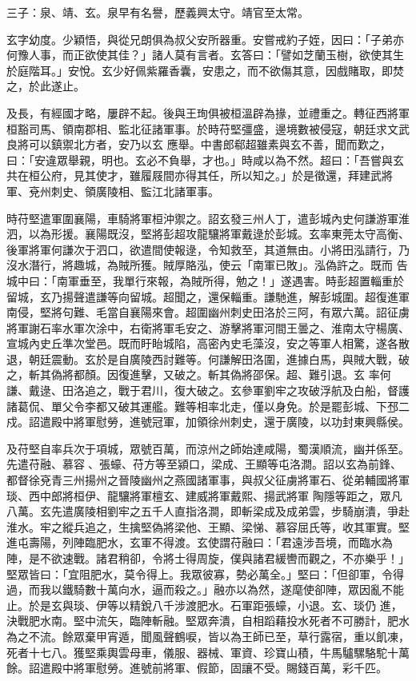 \begin{pinyinscope}
 三子：泉、靖、玄。泉早有名譽，歷義興太守。靖官至太常。



 玄字幼度。少穎悟，與從兄朗俱為叔父安所器重。安嘗戒約子姪，因曰：「子弟亦何豫人事，而正欲使其佳？」諸人莫有言者。玄答曰：「譬如芝蘭玉樹，欲使其生於庭階耳。」安悅。玄少好佩紫羅香囊，安患之，而不欲傷其意，因戲賭取，即焚之，於此遂止。



 及長，有經國才略，屢辟不起。後與王珣俱被桓溫辟為掾，並禮重之。轉征西將軍桓豁司馬、領南郡相、監北征諸軍事。於時苻堅彊盛，邊境數被侵寇，朝廷求文武良將可以鎮禦北方者，安乃以玄
 應舉。中書郎郗超雖素與玄不善，聞而歎之，曰：「安違眾舉親，明也。玄必不負舉，才也。」時咸以為不然。超曰：「吾嘗與玄共在桓公府，見其使才，雖履屐間亦得其任，所以知之。」於是徵還，拜建武將軍、兗州刺史、領廣陵相、監江北諸軍事。



 時苻堅遣軍圍襄陽，車騎將軍桓沖禦之。詔玄發三州人丁，遣彭城內史何謙游軍淮泗，以為形援。襄陽既沒，堅將彭超攻龍驤將軍戴逯於彭城。玄率東莞太守高衡、後軍將軍何謙次于泗口，欲遣間使報逯，令知救至，其道無由。小將田泓請行，乃沒水潛行，將趣城，為賊所獲。賊厚賂泓，使云「南軍已敗」。泓偽許之。既而
 告城中曰：「南軍垂至，我單行來報，為賊所得，勉之！」遂遇害。時彭超置輜重於留城，玄乃揚聲遣謙等向留城。超聞之，還保輜重。謙馳進，解彭城圍。超復進軍南侵，堅將句難、毛當自襄陽來會。超圍幽州刺史田洛於三阿，有眾六萬。詔征虜將軍謝石率水軍次涂中，右衛將軍毛安之、游擊將軍河間王曇之、淮南太守楊廣、宣城內史丘準次堂邑。既而盱眙城陷，高密內史毛藻沒，安之等軍人相驚，遂各散退，朝廷震動。玄於是自廣陵西討難等。何謙解田洛圍，進據白馬，與賊大戰，破之，斬其偽將都顏。因復進擊，又破之。斬其偽將邵保。超、難引退。玄
 率何謙、戴逯、田洛追之，戰于君川，復大破之。玄參軍劉牢之攻破浮航及白船，督護諸葛侃、單父令李都又破其運艦。難等相率北走，僅以身免。於是罷彭城、下邳二戍。詔遣殿中將軍慰勞，進號冠軍，加領徐州刺史，還于廣陵，以功封東興縣侯。



 及苻堅自率兵次于項城，眾號百萬，而涼州之師始達咸陽，蜀漢順流，幽并係至。先遣苻融、慕容、張蠔、苻方等至潁口，梁成、王顯等屯洛澗。詔以玄為前鋒、都督徐兗青三州揚州之晉陵幽州之燕國諸軍事，與叔父征虜將軍石、從弟輔國將軍琰、西中郎將桓伊、龍驤將軍檀玄、建威將軍戴熙、揚武將軍
 陶隱等距之，眾凡八萬。玄先遣廣陵相劉牢之五千人直指洛澗，即斬梁成及成弟雲，步騎崩潰，爭赴淮水。牢之縱兵追之，生擒堅偽將梁他、王顯、梁悌、慕容屈氏等，收其軍實。堅進屯壽陽，列陣臨肥水，玄軍不得渡。玄使謂苻融曰：「君遠涉吾境，而臨水為陣，是不欲速戰。諸君稍卻，令將士得周旋，僕與諸君緩轡而觀之，不亦樂乎！」堅眾皆曰：「宜阻肥水，莫令得上。我眾彼寡，勢必萬全。」堅曰：「但卻軍，令得過，而我以鐵騎數十萬向水，逼而殺之。」融亦以為然，遂麾使卻陣，眾因亂不能止。於是玄與琰、伊等以精銳八千涉渡肥水。石軍距張蠔，小退。玄、琰仍
 進，決戰肥水南。堅中流矢，臨陣斬融。堅眾奔潰，自相蹈藉投水死者不可勝計，肥水為之不流。餘眾棄甲宵遁，聞風聲鶴唳，皆以為王師已至，草行露宿，重以飢凍，死者十七八。獲堅乘輿雲母車，儀服、器械、軍資、珍寶山積，牛馬驢騾駱駝十萬餘。詔遣殿中將軍慰勞。進號前將軍、假節，固讓不受。賜錢百萬，彩千匹。



\end{pinyinscope}
